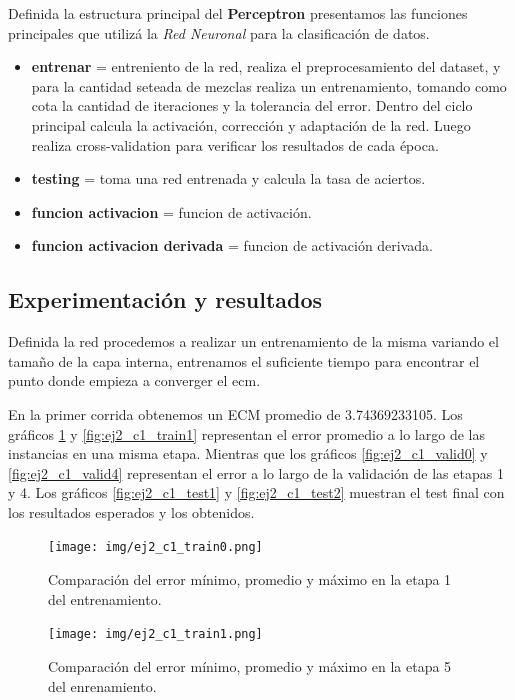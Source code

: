 \documentclass[onecolumn,10pt]{article}
\begin{document}
Definida la estructura principal del \textbf{Perceptron} presentamos
las funciones principales que utilizá la \emph{Red Neuronal} para
la clasificación de datos.


\begin{itemize}
\item \textbf{entrenar} = entreniento de la red, realiza el preprocesamiento
del dataset, y para la cantidad seteada de mezclas realiza un entrenamiento, tomando
como cota la cantidad de iteraciones y la tolerancia del error. Dentro del ciclo principal
calcula la activación, corrección y adaptación de la red. Luego realiza cross-validation para
verificar los resultados de cada época.
\item \textbf{testing} = toma una red entrenada y calcula la tasa de aciertos.
\item \textbf{funcion activacion} = funcion de activación.
\item \textbf{funcion activacion derivada} = funcion de activación derivada.
\end{itemize}


\subsection{Experimentación y resultados}

Definida la red procedemos a realizar un entrenamiento de la misma variando el tamaño de la capa interna, entrenamos el suficiente tiempo para encontrar el punto donde empieza a converger el ecm.


En la primer corrida obtenemos un ECM promedio de 3.74369233105. Los gráficos \ref{fig:ej2_c1_train0} y \ref{fig:ej2_c1_train1} representan el error promedio a lo largo de las instancias en una misma etapa. Mientras que los gráficos \ref{fig:ej2_c1_valid0} y \ref{fig:ej2_c1_valid4} representan el error a lo largo de la validación de las etapas 1 y 4. Los gráficos \ref{fig:ej2_c1_test1} y \ref{fig:ej2_c1_test2} muestran el test final con los resultados esperados y los obtenidos.

\begin{figure}[H]
  \centering
  \texttt{[image: img/ej2\_c1\_train0.png]}
  \caption{Comparación del error mínimo, promedio y máximo en la etapa 1 del entrenamiento.}
  \label{fig:ej2_c1_train0}
\end{figure}

\begin{figure}[H]
  \centering
  \texttt{[image: img/ej2\_c1\_train1.png]}
  \caption{Comparación del error mínimo, promedio y máximo en la etapa 5 del enrenamiento.}
  \label{fig:ej2_c1_train4}
\end{figure}
\end{document}
